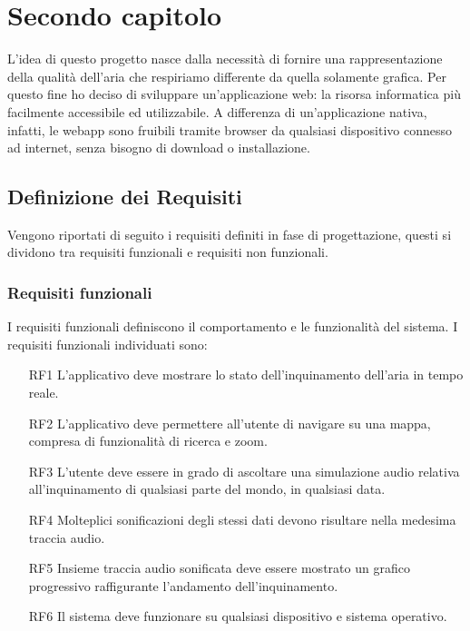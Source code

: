 \clearpage{\pagestyle{empty}\cleardoublepage}
\chapter{Secondo capitolo}                %

L'idea di questo progetto nasce dalla necessità di fornire una rappresentazione della qualità dell'aria che respiriamo differente da quella solamente grafica.
Per questo fine ho deciso di sviluppare un'applicazione web: la risorsa informatica più facilmente accessibile ed utilizzabile.
A differenza di un'applicazione nativa, infatti, le webapp sono fruibili tramite browser da qualsiasi dispositivo connesso ad internet, senza bisogno di download o installazione.

\section{Definizione dei Requisiti}
Vengono riportati di seguito i requisiti definiti in fase di progettazione, questi si dividono tra requisiti funzionali e requisiti non funzionali.
\subsection{Requisiti funzionali}
I requisiti funzionali definiscono il comportamento e le funzionalità del sistema.
I requisiti funzionali individuati sono:
\begin{itemize}
    \item[RF1] L'applicativo deve mostrare lo stato dell'inquinamento dell'aria in tempo reale.
    \item[RF2] L'applicativo deve permettere all'utente di navigare su una mappa, compresa di funzionalità di ricerca e zoom. 
    \item[RF3] L'utente deve essere in grado di ascoltare una simulazione audio relativa all'inquinamento di qualsiasi parte del mondo, in qualsiasi data.
    \item[RF4] Molteplici sonificazioni degli stessi dati devono risultare nella medesima traccia audio.
    \item[RF5] Insieme traccia audio sonificata deve essere mostrato un grafico progressivo raffigurante l'andamento dell'inquinamento.  
    \item[RF6] Il sistema deve funzionare su qualsiasi dispositivo e sistema operativo.
\end{itemize}

